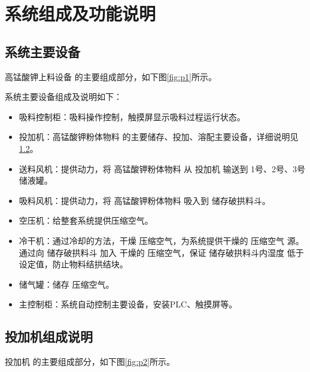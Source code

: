 \documentclass[UTF8,a4paper,12pt,titlepage]{ctexart}
\begin{document}


\tableofcontents %

\newpage %


\section{系统组成及功能说明}
   \subsection{系统主要设备}
   高锰酸钾上料设备 的主要组成部分，如下图\ref{fig:p1}所示。

   
   系统主要设备组成及说明如下：
   \begin{itemize}
       \item 吸料控制柜：吸料操作控制，触摸屏显示吸料过程运行状态。
       \item 投加机：高锰酸钾粉体物料 的主要储存、投加、溶配主要设备，详细说明见\ref{main_machine}。
       \item 送料风机：提供动力，将 高锰酸钾粉体物料 从 投加机 输送到 1号、2号、3号储液罐。
       \item 吸料风机：提供动力，将 高锰酸钾粉体物料 吸入到 储存破拱料斗。
       \item 空压机：给整套系统提供压缩空气。
       \item 冷干机：通过冷却的方法，干燥 压缩空气，为系统提供干燥的 压缩空气 源。
           通过向 储存破拱料斗 加入 干燥的 压缩空气，保证 储存破拱料斗内湿度 低于设定值，防止物料结拱结块。
       \item 储气罐：储存 压缩空气。
       \item 主控制柜：系统自动控制主要设备，安装PLC、触摸屏等。
   \end{itemize}

   \subsection{投加机组成说明}\label{main_machine}
   投加机 的主要组成部分，如下图\ref{fig:p2}所示。
\end{document}
